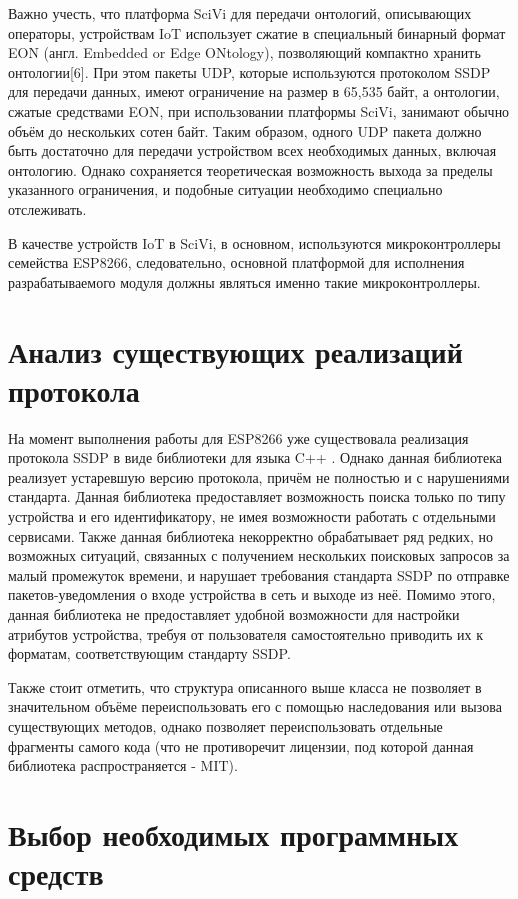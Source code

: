 Важно учесть, что платформа SciVi для передачи онтологий, описывающих операторы, устройствам IoT использует сжатие в специальный бинарный формат EON (англ.
Embedded or Edge ONtology), позволяющий компактно хранить онтологии[6].
При этом пакеты UDP, которые используются протоколом SSDP для передачи данных, имеют ограничение на размер в 65,535 байт, а онтологии, сжатые средствами EON, при использовании платформы SciVi, занимают обычно объём до нескольких сотен байт.
Таким образом, одного UDP пакета должно быть достаточно для передачи устройством всех необходимых данных, включая онтологию.
Однако сохраняется теоретическая возможность выхода за пределы указанного ограничения, и подобные ситуации необходимо специально отслеживать.

В качестве устройств IoT в SciVi, в основном, используются микроконтроллеры семейства ESP8266, следовательно, основной платформой для исполнения разрабатываемого модуля должны являться именно такие микроконтроллеры.

\section{Анализ существующих реализаций протокола}

На момент выполнения работы для ESP8266 уже существовала реализация протокола SSDP в виде библиотеки для языка C++ \cite{bib:library}.
Однако данная библиотека реализует устаревшую версию протокола, причём не полностью и с нарушениями стандарта.
Данная библиотека предоставляет возможность поиска только по типу устройства и его идентификатору, не имея возможности работать с отдельными сервисами.
Также данная библиотека некорректно обрабатывает ряд редких, но возможных ситуаций, связанных с получением нескольких поисковых запросов за малый промежуток времени, и нарушает требования стандарта SSDP по отправке пакетов-уведомления о входе устройства в сеть и выходе из неё.
Помимо этого, данная библиотека не предоставляет удобной возможности для настройки атрибутов устройства, требуя от пользователя самостоятельно приводить их к форматам, соответствующим стандарту SSDP.

Также стоит отметить, что структура описанного выше класса не позволяет в значительном объёме переиспользовать его с помощью наследования или вызова существующих методов, однако позволяет переиспользовать отдельные фрагменты самого кода (что не противоречит лицензии, под которой данная библиотека распространяется - MIT).

\section{Выбор необходимых программных средств}

